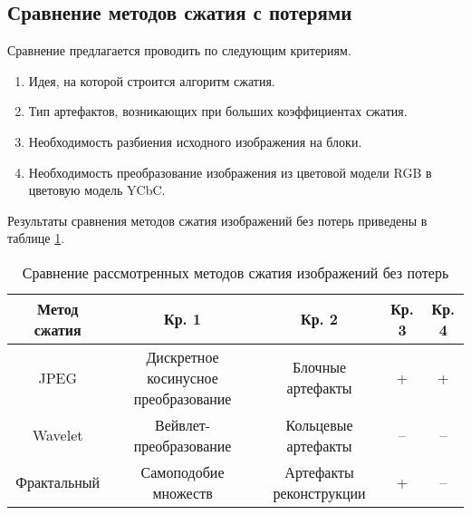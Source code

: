\subsection{Сравнение методов сжатия с потерями}

Сравнение предлагается проводить по следующим критериям.
\begin{enumerate}
    \item Идея, на которой строится алгоритм сжатия.
    \item Тип артефактов, возникающих при больших коэффициентах сжатия.
    \item Необходимость разбиения исходного изображения на блоки.
    \item Необходимость преобразование изображения из цветовой модели RGB в цветовую модель YCbC.
\end{enumerate}

Результаты сравнения методов сжатия изображений без потерь приведены в таблице \ref{tbl:compare_realizations2}.
\captionsetup{justification=raggedleft,singlelinecheck=false}
\begin{table}[H]
    \centering
	\caption{Сравнение рассмотренных методов сжатия изображений без потерь}
    \label{tbl:compare_realizations2}
	\begin{tabular}{|c|c|c|c|c|}
        \hline
        \textbf{Метод сжатия} & \textbf{Кр. 1} & \textbf{Кр. 2} & \textbf{Кр. 3} & \textbf{Кр. 4}
        \\ \hline
        JPEG        & \begin{minipage}[t]{5.5cm}\centering Дискретное косинусное \newline преобразование \end{minipage} & \begin{minipage}[t]{3.1cm}\centering Блочные \newline артефакты \newline \end{minipage} & + & + \\ \hline
        Wavelet     & Вейвлет-преобразование & \begin{minipage}[t]{3.1cm}\centering Кольцевые \newline артефакты \newline \end{minipage}     & -- & --  \\ \hline 
        Фрактальный & Самоподобие множеств   & \begin{minipage}[t]{3.1cm}\centering Артефакты \newline реконструкции \newline \end{minipage} & +  & -- \\ \hline
    \end{tabular}
\end{table}

